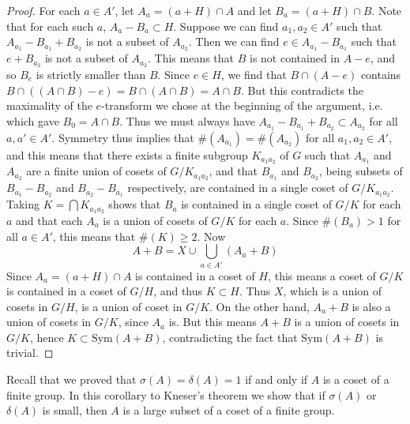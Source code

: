 \begin{proof}
    For each $a \in A'$, let $A_a = (a + H) \cap A$ and let $B_a = (a + H) \cap B$. Note that for each such $a$, $A_a - B_a \subset H$. Suppose we can find $a_1,a_2 \in A'$ such that $A_{a_1} - B_{a_1} + B_{a_2}$ is not a subset of $A_{a_2}$. Then we can find $e \in A_{a_1} - B_{a_1}$ such that $e + B_{a_2}$ is not a subset of $A_{a_2}$. This means that $B$ is not contained in $A - e$, and so $B_e$ is strictly smaller than $B$. Since $e \in H$, we find that $B \cap (A - e)$ contains $B \cap ((A \cap B) - e) = B \cap (A \cap B) = A \cap B$. But this contradicts the maximality of the $e$-transform we chose at the beginning of the argument, i.e. which gave $B_0 = A \cap B$. Thus we must always have $A_{a_1} - B_{a_1} + B_{a_2} \subset A_{a_2}$ for all $a,a' \in A'$. Symmetry thus implies that $\#(A_{a_1}) = \#(A_{a_2})$ for all $a_1,a_2 \in A'$, and this means that there exists a finite subgroup $K_{a_1a_2}$ of $G$ such that $A_{a_1}$ and $A_{a_2}$ are a finite union of cosets of $G/K_{a_1a_2}$, and that $B_{a_1}$ and $B_{a_2}$, being subsets of $B_{a_1} - B_{a_2}$ and $B_{a_2} - B_{a_1}$ respectively, are contained in a single coset of $G/K_{a_1a_2}$. Taking $K = \bigcap K_{a_1a_2}$ shows that $B_a$ is contained in a single coset of $G/K$ for each $a$ and that each $A_a$ is a union of cosets of $G/K$ for each $a$. Since $\#(B_a) > 1$ for all $a \in A'$, this means that $\#(K) \geq 2$. Now
    \[ A + B = X \cup \bigcup_{a \in A'} (A_a + B) \]
    Since $A_a = (a + H) \cap A$ is contained in a coset of $H$, this means a coset of $G/K$ is contained in a coset of $G/H$, and thus $K \subset H$. Thus $X$, which is a union of cosets in $G/H$, is a union of coset in $G/K$. On the other hand, $A_a + B$ is also a union of cosets in $G/K$, since $A_a$ is. But this means $A + B$ is a union of cosets in $G/K$, hence $K \subset \text{Sym}(A + B)$, contradicting the fact that $\text{Sym}(A + B)$ is trivial.
\end{proof}

Recall that we proved that $\sigma(A) = \delta(A) = 1$ if and only if $A$ is a coset of a finite group. In this corollary to Kneser's theorem we show that if $\sigma(A)$ or $\delta(A)$ is small, then $A$ is a large subset of a coset of a finite group.

